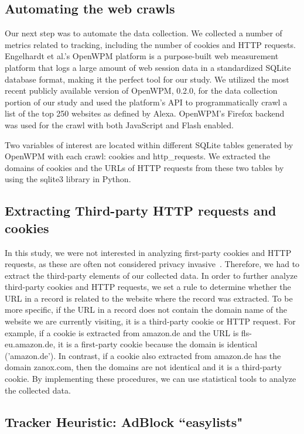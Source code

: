 \documentclass[conference]{IEEEtran}
\begin{document}
\subsection{Automating the web crawls}

Our next step was to automate the data collection.  We collected a number of metrics related to tracking, including the number of cookies and HTTP requests. Engelhardt et al.'s OpenWPM platform is a purpose-built web measurement platform that logs a large amount of web session data in a standardized SQLite database format, making it the perfect tool for our study. We utilized the most recent publicly available version of OpenWPM, 0.2.0, for the data collection portion of our study and used the platform's API to programmatically crawl a list of the top 250 websites as defined by Alexa\cite{Alexa}. OpenWPM's Firefox backend was used for the crawl with both JavaScript and Flash enabled.

Two variables of interest are located within different SQLite tables generated by OpenWPM with each crawl: cookies and http\_requests. We extracted the domains of cookies and the URLs of HTTP requests from these two tables by using the sqlite3 library in Python.

\subsection{Extracting Third-party HTTP requests and cookies}

In this study, we were not interested in analyzing first-party cookies and HTTP requests, as these are often not considered privacy invasive~\cite{mcdonald2011track}. Therefore, we had to extract the third-party elements of our collected data. In order to further analyze third-party cookies and HTTP requests, we set a rule to determine whether the URL in a record is related to the website where the record was extracted. To be more specific, if the URL in a record does not contain the domain name of the website we are currently visiting, it is a third-party cookie or HTTP request. For example, if a cookie is extracted from amazon.de and the URL is fls-eu.amazon.de, it is a first-party cookie because the domain is identical ('amazon.de'). In contrast, if a cookie also extracted from amazon.de has the domain zanox.com, then the domains are not identical and it is a third-party cookie. By implementing these procedures, we can use statistical tools to analyze the collected data.

\subsection{Tracker Heuristic: AdBlock ``easylists"}
\end{document}
